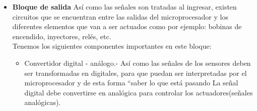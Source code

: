 \begin{itemize}
\begin{itemize}
\begin{itemize}
            La memoria ROM es una memoria de consulta y al igual que la memoria EPROM no se borra ni al cerrar el contacto, ni al desconectar la batería.
        \end{itemize}
        \item \textbf{Microprocesador:} Es el componente físico principal dentro de la unidad de control, encargado de ejecutar las instrucciones de software para optimizar el funcionamiento del motor. Este elemento realiza los cálculos matemáticos, la toma de decisiones y ejecuta las estrategias de emergencia.
        Contiene en su interior tres dispositivos fundamentales:
        \begin{itemize}
            \item \textbf{Unidad lógica de calculo (ALU):}Realiza las operaciones aritméticas y las operaciones lógicas.
            \item \textbf{Acumulador:} Es una memoria intermedia que permite al CPU guardar datos mientras trabaja con otros que están directamente relacionados con el proceso en curso.
            \item \textbf{Unidad de control:} Es el elemento activo que solicita los datos, controla las entradas, las salidas y el desarrollo de las operaciones.
        \end{itemize}
        
    \end{itemize}

    \item \textbf{Bloque de salida} Así como las señales son tratadas al ingresar, existen circuitos que se encuentran entre las salidas del microprocesador y los diferentes elementos que van a ser actuados como por ejemplo: bobinas de encendido, inyectores, relés, etc. \\
    Tenemos los siguientes componentes importantes en este bloque:
    \begin{itemize}
        \item Convertidor digital - análogo.- Así como las señales de los sensores deben ser transformadas en digitales, para que puedan ser interpretadas por el microprocesador y de esta forma “saber lo que está pasando La señal digital debe convertirse en analógica para controlar los actuadores(señales analógicas).
        

\end{itemize}
\end{itemize}
